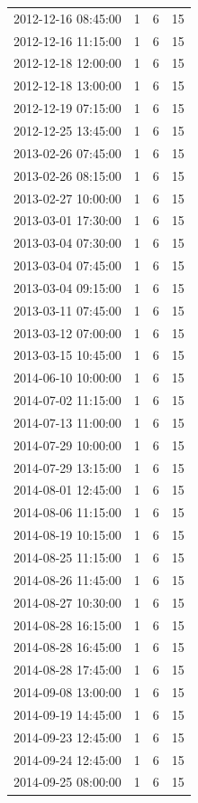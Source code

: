\begin{tabular}{lrrr}
2012-12-16 08:45:00 & 1 & 6 & 15 \\
2012-12-16 11:15:00 & 1 & 6 & 15 \\
2012-12-18 12:00:00 & 1 & 6 & 15 \\
2012-12-18 13:00:00 & 1 & 6 & 15 \\
2012-12-19 07:15:00 & 1 & 6 & 15 \\
2012-12-25 13:45:00 & 1 & 6 & 15 \\
2013-02-26 07:45:00 & 1 & 6 & 15 \\
2013-02-26 08:15:00 & 1 & 6 & 15 \\
2013-02-27 10:00:00 & 1 & 6 & 15 \\
2013-03-01 17:30:00 & 1 & 6 & 15 \\
2013-03-04 07:30:00 & 1 & 6 & 15 \\
2013-03-04 07:45:00 & 1 & 6 & 15 \\
2013-03-04 09:15:00 & 1 & 6 & 15 \\
2013-03-11 07:45:00 & 1 & 6 & 15 \\
2013-03-12 07:00:00 & 1 & 6 & 15 \\
2013-03-15 10:45:00 & 1 & 6 & 15 \\
2014-06-10 10:00:00 & 1 & 6 & 15 \\
2014-07-02 11:15:00 & 1 & 6 & 15 \\
2014-07-13 11:00:00 & 1 & 6 & 15 \\
2014-07-29 10:00:00 & 1 & 6 & 15 \\
2014-07-29 13:15:00 & 1 & 6 & 15 \\
2014-08-01 12:45:00 & 1 & 6 & 15 \\
2014-08-06 11:15:00 & 1 & 6 & 15 \\
2014-08-19 10:15:00 & 1 & 6 & 15 \\
2014-08-25 11:15:00 & 1 & 6 & 15 \\
2014-08-26 11:45:00 & 1 & 6 & 15 \\
2014-08-27 10:30:00 & 1 & 6 & 15 \\
2014-08-28 16:15:00 & 1 & 6 & 15 \\
2014-08-28 16:45:00 & 1 & 6 & 15 \\
2014-08-28 17:45:00 & 1 & 6 & 15 \\
2014-09-08 13:00:00 & 1 & 6 & 15 \\
2014-09-19 14:45:00 & 1 & 6 & 15 \\
2014-09-23 12:45:00 & 1 & 6 & 15 \\
2014-09-24 12:45:00 & 1 & 6 & 15 \\
2014-09-25 08:00:00 & 1 & 6 & 15 \\

\end{tabular}
